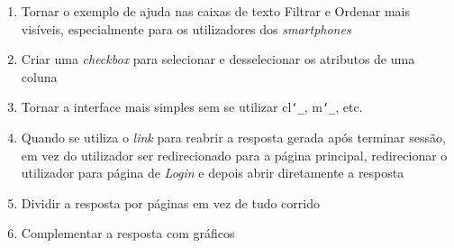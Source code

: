 \documentclass[11pt,twoside,a4paper]{report}
\begin{document}
\begin{enumerate}
	\item Tornar o exemplo de ajuda nas caixas de texto Filtrar e Ordenar mais visíveis, especialmente para os utilizadores dos \textit{smartphones}
	\item Criar uma \textit{checkbox} para selecionar e desselecionar os atributos de uma coluna
	\item Tornar a interface mais simples sem se utilizar cl\texttt{\char`_}, m\texttt{\char`_}, etc.
	\item Quando se utiliza o \textit{link} para reabrir a resposta gerada após terminar sessão, em vez do utilizador ser redirecionado para a página principal, redirecionar o utilizador para página de \textit{Login} e depois abrir diretamente a resposta
	\item Dividir a resposta por páginas em vez de tudo corrido
	\item Complementar a resposta com gráficos
\end{enumerate}
\end{document}
